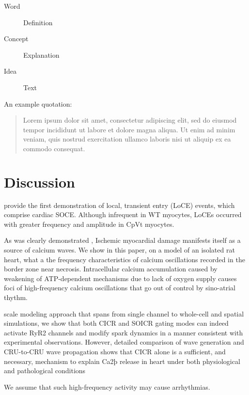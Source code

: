 \documentclass{biophys-new}
\begin{document}
\begin{description}
\item[Word] Definition
\item[Concept] Explanation
\item[Idea] Text
\end{description}

An example quotation:

\begin{quote}
Lorem ipsum dolor sit amet, consectetur adipiscing elit, sed do eiusmod tempor incididunt ut labore et dolore magna aliqua. Ut enim ad minim veniam, quis nostrud exercitation ullamco laboris nisi ut aliquip ex ea commodo consequat.
\end{quote}


\section*{Discussion}

\cite{bonilla2019enhancement} provide the first demonstration of local, transient  entry
(LoCE) events, which comprise cardiac SOCE. Although infrequent in WT myocytes, LoCEs occurred
with greater frequency and amplitude in CpVt myocytes.

As was clearly demonstrated \cite{matsuura2018intravital},
Ischemic myocardial damage manifests itself as a source of calcium waves.
We show in this paper, on a model of an isolated rat heart, what a the frequency characteristics of calcium oscillations recorded in the border zone near necrosis.
Intracellular calcium accumulation caused by weakening of ATP-dependent mechanisms due to lack of oxygen supply causes foci of high-frequency calcium oscillations that go out of control by sino-atrial thythm.

scale modeling approach that spans from single channel to whole-cell and spatial
simulations, we show that both CICR and SOICR gating modes can indeed activate RyR2 channels and modify  spark dynamics in a manner consistent
with experimental observations. However, detailed comparison of  wave
generation and CRU-to-CRU  wave propagation shows that CICR alone
is a sufficient, and necessary, mechanism to explain Ca2þ release in heart under
both physiological and pathological conditions
\cite{williams2017does}

We assume that such high-frequency activity may cause arrhythmias.
\end{document}
